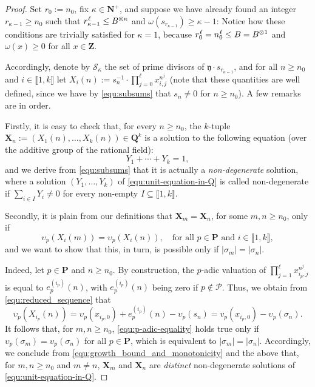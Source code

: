 \documentclass[reqno]{amsart}
\theoremstyle{remark}
\providecommand\llb{\llbracket}
\providecommand\rrb{\rrbracket}
\newcommand{\fixed}[2][1]{%
  \begingroup
  \spaceskip=#1\fontdimen2\font minus \fontdimen4\font
  \xspaceskip=0pt\relax
  #2%
  \endgroup
}
\begin{document}
%
\begin{proof}
Set $r_0 := n_0$, fix $\kappa \in \mathbf N^+$, and suppose we have already found an integer $r_{\kappa-1} \ge n_0$ such that $r_{\kappa-1}^{\fixed[0.15]{\text{ }}\ell} \le B^{\otimes \kappa}$ and $\omega(s_{r_{\kappa-1}}) \ge \kappa-1$: Notice how these conditions are trivially satisfied for $\kappa = 1$, because $r_0^{\fixed[0.15]{\text{ }}\ell} = n_0^{\fixed[0.15]{\text{ }}\ell} \le B = B^{\otimes 1}$ and $\omega(x) \ge 0$ for all $x \in \mathbf Z$.

Accordingly, denote by $\mathcal S_\kappa$ the set of prime divisors of $\mathfrak y \cdot s_{r_{\kappa-1}}$,
and for all $n \ge n_0$ and $i \in \llb 1, k \rrb$ let $X_i(n) := s_n^{-1} \cdot \prod_{j=0}^\ell x_{i,j}^{n^j}$ (note that these quantities are well defined, since we have by \eqref{equ:subsums} that $s_n \ne 0$ for $n \ge n_0$). A few remarks are in order.

Firstly, it is easy to check that, for every $n \ge n_0$, the $k$-tuple ${\bm X}_n := (X_1(n), \ldots, X_k(n)) \in \mathbf Q^k$ is a so\-lu\-tion to the following equation (over the additive group of the rational field):
\begin{equation}
\label{equ:unit-equation-in-Q}
Y_1 + \cdots + Y_k = 1,
\end{equation}
%
and we derive from \eqref{equ:subsums} that it is actually a \textit{non-degenerate} solution, where a solution $(Y_1, \ldots, Y_k)$ of \eqref{equ:unit-equation-in-Q} is called non-degenerate if $\sum_{i \in I} Y_i \ne 0$ for every non-empty $I \subseteq \llb 1, k \rrb$.

Secondly, it is plain from our definitions that
${\bm X}_{m} = {\bm X}_{n}$, for some $m, n \ge n_0$, only if
\begin{equation}
\label{equ:p-adic-equality}
\upsilon_p(X_i(m)) = \upsilon_p(X_i(n)),
\quad\text{for all }p \in \mathbf P
\text{ and }
i \in \llb 1, k \rrb,
\end{equation}
and we want to show that this, in turn, is possible only if
$|\sigma_m| = |\sigma_n|$.

Indeed, let $p \in \mathbf P$ and $n \ge n_0$. By construction,
the $p$-adic valuation of $\prod_{j=1}^\ell x_{i_p,j}^{n^j}$ is equal to $e_p^{(i_p)}(n)$, with $e_p^{(i_p)}(n)$ being zero if $p \notin \mathcal P$. Thus, we obtain from \eqref{equ:reduced_sequence} that
$$
\upsilon_p(X_{i_p}(n)) = \upsilon_p(x_{i_p,0}) + e_p^{(i_p)}(n) - \upsilon_p(s_{n}) = v_p(x_{i_p,0}) - \upsilon_p(\sigma_n).
$$
It follows that, for $m, n \ge n_0$, \eqref{equ:p-adic-equality} holds true only if $\upsilon_p(\sigma_m) = \upsilon_p(\sigma_n)$ for all $p \in \mathbf P$, which is equivalent to $|\sigma_m| = |\sigma_n|$. Accordingly, we conclude from \eqref{equ:growth_bound_and_monotonicity} and the above that, for $m, n \ge n_0$ and $m \ne n$, ${\bm X}_m$ and ${\bm X}_n$ are \textit{distinct} non-degenerate solutions of \eqref{equ:unit-equation-in-Q}.


\end{proof}
\end{document}
